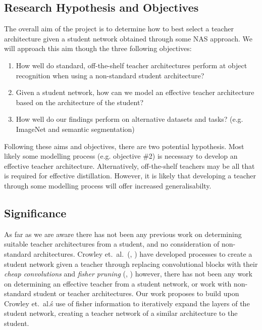 \documentclass[a4paper,11pt]{article}
\begin{document}
\subsection{Research Hypothesis and Objectives}
\label{subsec:objectives}
The overall aim of the project is to determine how to best select a teacher architecture given a student network obtained through some NAS approach. We will approach this aim though the three following objectives:
\begin{enumerate}
    \item How well do standard, off-the-shelf teacher architectures perform at object recognition when using a non-standard student architecture?
    \item Given a student network, how can we model an effective teacher architecture based on the architecture of the student?
    \item How well do our findings perform on alternative datasets and tasks? (e.g. ImageNet and semantic segmentation)
\end{enumerate}

Following these aims and objectives, there are two potential hypothesis. Most likely some modelling process (e.g. objective \#2) is necessary to develop an effective teacher architecture. Alternatively, off-the-shelf teachers may be all that is required for effective distillation. However, it is likely that developing a teacher through some modelling process will offer increased generalisabilty. 




\subsection{Significance}
As far as we are aware there has not been any previous work on determining suitable teacher architectures from a student, and no consideration of non-standard architectures.  Crowley et.\ al.\ (\cite{crowley2018moonshine}, \cite{turner2019distilling}) have developed processes to create a student network given a teacher through replacing convolutional blocks with their \textit{cheap convolutions} and \textit{fisher pruning} (\cite{theis2018faster}, \cite{molchanov2016pruning}) however, there has not been any work on determining an effective teacher from a student network, or work with non-standard student or teacher architectures. Our work proposes to build upon Crowley et.\ al.\'s use of fisher information to iteratively expand the layers of the student network, creating a teacher network of a similar architecture to the student.
\end{document}
